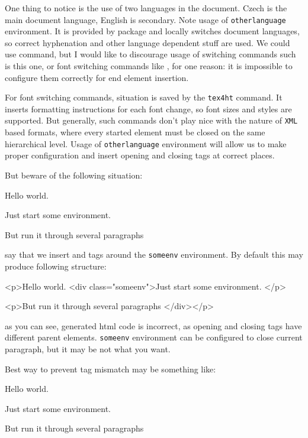 One thing to notice is the use of two languages in the document. 
Czech is the main document language, English is secondary. 
Note usage of \texttt{otherlanguage} environment. 
It is provided by  package and locally
switches document languages, so correct hyphenation and other language
dependent stuff are used. We could use
\texcommand{\selectlanguage} command, but I would like to
discourage usage of switching commands such is this one, or font
switching commands like \texcommand{\bfseries}, for one
reason: it is impossible to configure them correctly for end element
insertion. 

For font switching commands, situation is saved by the
\texttt{tex4ht} command. It inserts formatting instructions for each
font change, so font sizes and styles are supported. 
But generally, such commands don't play nice with the nature of
\texttt{XML} based formats, where every started element must be closed
on the same hierarchical level. 
Usage of \texttt{otherlanguage} environment will allow us to make proper
configuration and insert opening and closing tags at correct places.

But beware of the following situation:

\begin{texsource}
Hello world.
\begin{someenv}
Just start some environment.

But run it through several paragraphs
\end{someenv}
\end{texsource}

say that we insert
 and
 tags around  the \texttt{someenv}
environment. By default this may produce following structure:

\begin{htmlsource}
<p>Hello world.
<div class="someenv">Just start some environment.
</p>

<p>But run it through several paragraphs
</div></p>
\end{htmlsource}

as you can see, generated html code is incorrect, as opening and closing
 tags have different parent elements. \texttt{someenv} environment can
be configured to close current paragraph, but it may be not what you
want.

Best way to prevent tag mismatch may be something like:

\begin{texsource}
Hello world.
\begin{someenv}
Just start some environment.
\end{someenv}

\begin{someenv}
But run it through several paragraphs
\end{someenv}
\end{texsource}

